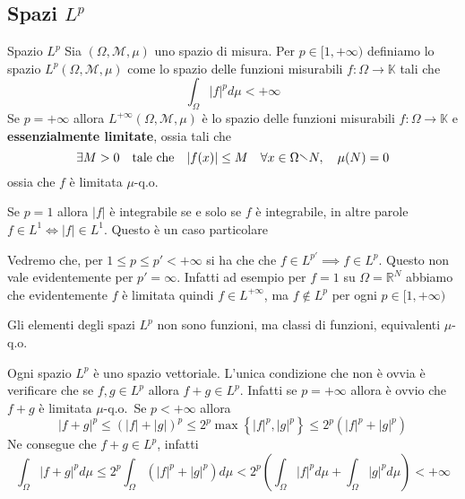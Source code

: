 \newpage
\subsection{Spazi \(L^{p}\) }
\begin{definition}{Spazio \(L^{p}\)}
    Sia \((\Omega, \mathcal{M}, \mu)\) uno spazio di misura. Per \(p \in [1,
    +\infty)\) definiamo lo spazio \(L^{p}(\Omega, \mathcal{M}, \mu)\) come lo
    spazio delle funzioni misurabili \(f : \Omega \to \mathbb{K}\) tali che
    \[
    \int_{\Omega} |f|^{p} d\mu < +\infty
    \]
    Se \(p = +\infty\) allora \(L^{+\infty}(\Omega, \mathcal{M}, \mu)\) è lo
    spazio delle funzioni misurabili \(f : \Omega \to \mathbb{K}\) e
    \textbf{essenzialmente limitate}, ossia tali che
    \[
        \exists M > 0 \quad \text{tale che} \quad |f(x)| \le M \quad
        \forall x \in \Omega \sminus N, \quad \mu(N) = 0
    \]
    ossia che \(f\) è limitata \(\mu\)-q.o.
\end{definition}
\begin{note}
    Se \(p=1\) allora \(|f|\) è integrabile se e solo se \(f\) è integrabile, in
    altre parole \(f \in L^{1} \iff |f| \in L^{1}\). Questo è un caso
    particolare
\end{note}
\begin{note}
    Vedremo che, per \(1 \le p \le p' < +\infty\) si ha che che \(f \in L^{p'}
    \implies f \in L^{p}\). Questo non vale evidentemente per \(p' = \infty\).
    Infatti ad esempio per \(f = 1\) su \(\Omega = \mathbb{R}^{N}\) abbiamo che
    evidentemente \(f\) è limitata quindi \(f \in L^{+\infty}\), ma \(f \notin
    L^{p}\) per ogni \(p \in [1, +\infty)\) 
\end{note}
Gli elementi degli spazi \(L^{p}\) non sono funzioni, ma classi di funzioni,
equivalenti \(\mu\)-q.o.
\begin{remark}
    Ogni spazio \(L^{p}\) è uno spazio vettoriale. L'unica condizione che non è
    ovvia è verificare che se \(f, g \in L^{p}\) allora \(f+g \in L^{p}\).
    Infatti se \(p = +\infty\) allora è ovvio che \(f+g\) è limitata
    \(\mu\)-q.o.~Se \(p < +\infty\) allora 
    \[
    |f+g|^{p} \le {(|f| + |g|)}^{p} \le 2^{p}
    \max \left\{ |f|^{p}, |g|^{p} \right\} \le 2^{p} (|f|^{p} + |g|^{p})
    \]
    Ne consegue che \(f+g \in L^{p}\), infatti
    \[
        \int_{\Omega} |f+g|^{p} d\mu \le 2^{p} \int_{\Omega} (|f|^{p} + |g|^{p})
        d\mu < 2^{p} {\left( \int_\Omega |f|^{p} d\mu + \int_\Omega |g|^{p} d\mu
        \right)} < +\infty
    \]
\end{remark}
